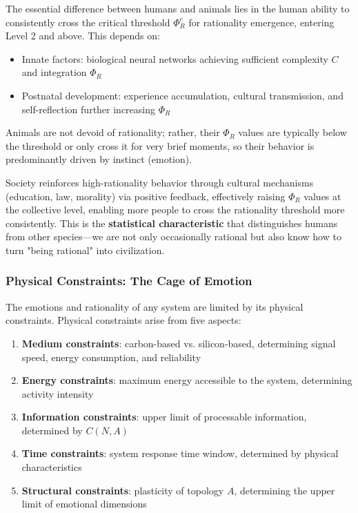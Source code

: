 \documentclass[12pt,a4paper]{article}
\theoremstyle{plain}
\begin{document}
The essential difference between humans and animals lies in the human ability to consistently cross the critical threshold $\Phi_R^c$ for rationality emergence, entering Level 2 and above. This depends on:
\begin{itemize}
    \item Innate factors: biological neural networks achieving sufficient complexity $C$ and integration $\Phi_R$
    \item Postnatal development: experience accumulation, cultural transmission, and self-reflection further increasing $\Phi_R$
\end{itemize}

Animals are not devoid of rationality; rather, their $\Phi_R$ values are typically below the threshold or only cross it for very brief moments, so their behavior is predominantly driven by instinct (emotion).

Society reinforces high-rationality behavior through cultural mechanisms (education, law, morality) via positive feedback, effectively raising $\Phi_R$ values at the collective level, enabling more people to cross the rationality threshold more consistently. This is the \textbf{statistical characteristic} that distinguishes humans from other species—we are not only occasionally rational but also know how to turn "being rational" into civilization.

\subsubsection{Physical Constraints: The Cage of Emotion}

The emotions and rationality of any system are limited by its physical constraints. Physical constraints arise from five aspects:

\begin{enumerate}
    \item \textbf{Medium constraints}: carbon-based vs. silicon-based, determining signal speed, energy consumption, and reliability
    \item \textbf{Energy constraints}: maximum energy accessible to the system, determining activity intensity
    \item \textbf{Information constraints}: upper limit of processable information, determined by $C(N,A)$
    \item \textbf{Time constraints}: system response time window, determined by physical characteristics
    \item \textbf{Structural constraints}: plasticity of topology $A$, determining the upper limit of emotional dimensions
\end{enumerate}
\end{document}

